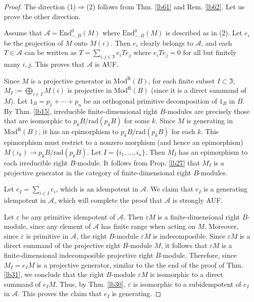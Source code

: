\documentclass[11pt,b5paper,notitlepage]{article}
\theoremstyle{definition}
\theoremstyle{plain}
\newcommand{\fk}{\mathfrak}
\newcommand{\mc}{\mathcal}
\newcommand{\End}{\mathrm{End}} %
\newcommand{\ModR}{\mathrm{Mod}^{\mathrm R}}
\newcommand{\eps}{\varepsilon}
\newcommand{\rad}{\mathrm{rad}}
\numberwithin{equation}{section}
\begin{document}
\begin{proof}
The direction (1)$\Rightarrow$(2) follows from Thm. \ref{lb61} and Rem. \ref{lb62}. Let us prove the other direction.

Assume that $\mc A=\End^0_{-,B}(M)$ where $\End^0_{-,B}(M)$ is described as in (2). Let $e_i$ be the projection of $M$ onto $M(i)$. Then $e_i$ clearly belongs to $\mc A$, and each $T\in\mc A$ can be written as $T=\sum_{i,j\in\fk I}e_i Te_j$ where $e_iTe_j=0$ for all but finitely many $i,j$. This proves that $\mc A$ is AUF.

Since $M$ is a projective generator in $\ModR(B)$, for each finite subset $I\subset\fk I$, $M_I:=\bigoplus_{i\in I}M(i)$ is projective in $\ModR(B)$ (since it is a direct summand of $M$). Let $1_B=p_1+\cdots+p_n$ be an orthogonal primitive decomposition of $1_B$ in $B$. By Thm. \ref{lb15}, irreducible finite-dimensional right $B$-modules are precisely those that are isomorphic to $p_kB/\rad(p_kB)$ for some $k$. Since $M$ is generating in $\ModR(B)$, it has an epimorphism to $p_kB/\rad(p_kB)$ for each $k$. This epimorphism must restrict to a nonzero morphism (and hence an epimorphism) $M(i_k)\rightarrow p_kB/\rad(p_kB)$. Let $I=\{i_1,\dots,i_n\}$. Then $M_I$ has an epimorphism to each irreducible right $B$-module. It follows from Prop. \ref{lb27} that $M_I$ is a projective generator in the category of finite-dimensional right $B$-modules. 

Let $e_I=\sum_{i\in I}e_i$, which is an idempotent in $\mc A$. We claim that $e_I$ is a generating idempotent in $\mc A$, which will complete the proof that $\mc A$ is strongly AUF.

Let $\eps$ be any primitive idempotent of $\mc A$. Then $\eps M$ is a finite-dimensional right $B$-module, since any element of $\mc A$ has finite range when acting on $M$. Moreover, since $\eps$ is primitive in $\mc A$, the right $B$-module $\eps M$ is indecomposible. Since $\eps M$ is a direct summand of the projective right $B$-module $M$, it follows that $\eps M$ is a finite-dimensional indecomposible projective right $B$-module. Therefore, since $M_I=e_IM$ is a projective generator, similar to the the end of the proof of Thm. \ref{lb31}, we conclude that the right $B$-module $\eps M$ is isomorphic to a direct summand of $e_IM$. Thus, by Thm. \ref{lb30}, $\eps$ is isomorphic to a subidempotent of $e_I$ in $\mc A$. This proves the claim that $e_I$ is generating.
\end{proof}
\end{document}

